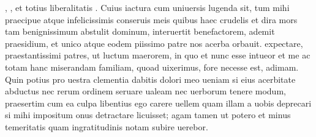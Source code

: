 \documentclass[a5paper,twoside]{article}
\begin{document}
, , et totius liberalitatis . Cuius iactura cum uniuersis lugenda sit, tum mihi praecipue atque  infelicissimis conseruis meis quibus haec crudelis et dira mors tam benignissimum abstulit dominum, interuertit benefactorem, ademit praesidium, et unico atque eodem piissimo patre nos acerba orbauit.  expectare, praestantissimi patres, ut luctum  maerorem, in quo et  nunc esse intueor et me ac totam hanc miserandam familiam, quoad uixerimus, fore necesse est,  adimam. Quin potius pro uestra clementia dabitis dolori meo ueniam si eius acerbitate abductus nec rerum ordinem seruare ualeam nec uerborum tenere modum, praesertim cum ea culpa libentius ego carere uellem quam illam a uobis deprecari si mihi impositum onus detractare licuisset; agam tamen ut potero et minus temeritatis quam ingratitudinis notam subire uerebor.
\end{document}

